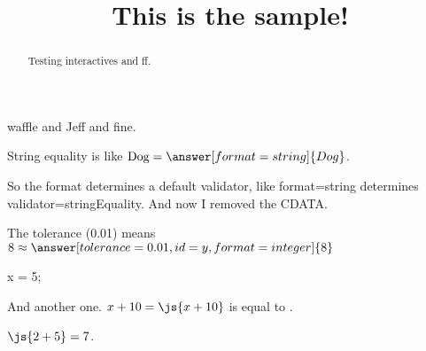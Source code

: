 \documentclass{ximera}
\title{This is the sample!}
\begin{document}
\begin{abstract}
Testing interactives and ff.
\end{abstract}

\maketitle

waffle and Jeff and fine.


\begin{problem}
  String equality is like $\mbox{Dog} = \answer[format=string]{Dog}$.

  So the format determines a default validator, like format=string determines validator=stringEquality.  And now I removed the CDATA.
\end{problem}

\begin{problem}
  The tolerance (0.01) means $8 \approx \answer[tolerance=0.01,id=y,format=integer]{8}$
  
  \begin{feedback}[72]
  \end{feedback}
\end{problem}

\begin{javascript}
x = 5;
\end{javascript}

And another one.  $x + 10 = \js{x+10}$ is equal to .

$\js{2+5} = 7$.
\end{document}
